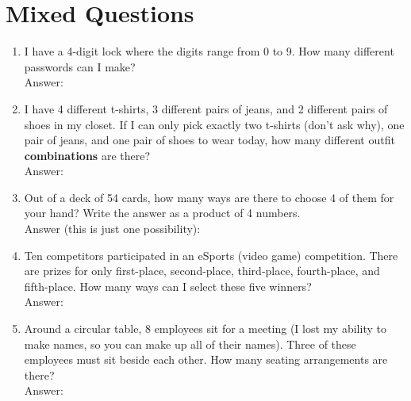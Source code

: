 \documentclass[11pt]{extarticle}
\begin{document}
\section{Mixed Questions}
\begin{enumerate}
    \itemsep 3.5em
    \item {I have a 4-digit lock where the digits range from 0 to 9. How many different passwords can I make? \\Answer: }
    \item {I have 4 different t-shirts, 3 different pairs of jeans, and 2 different pairs of shoes in my closet. If I can only pick exactly two t-shirts (don't ask why), one pair of jeans, and one pair of shoes to wear today, how many different outfit \textbf{combinations} are there? \\Answer: }
    \item {Out of a deck of 54 cards, how many ways are there to choose 4 of them for your hand? Write the answer as a product of 4 numbers. \\Answer (this is just one possibility): }
    \item {Ten competitors participated in an eSports (video game) competition. There are prizes for only first-place, second-place, third-place, fourth-place, and fifth-place. How many ways can I select these five winners? \\Answer: }
    \item {Around a circular table, 8 employees sit for a meeting (I lost my ability to make names, so you can make up all of their names). Three of these employees must sit beside each other. How many seating arrangements are there? \\Answer: }
\end{enumerate}
\end{document}
